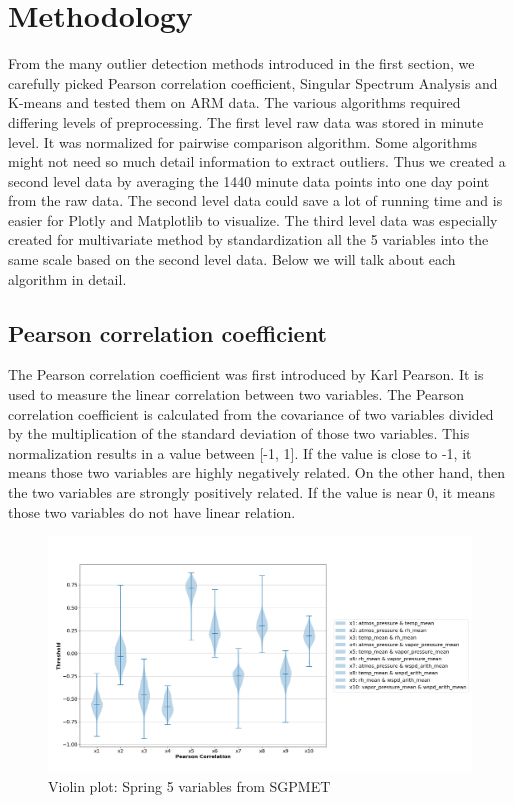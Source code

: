 \documentclass[letterpaper, 10 pt, conference]{ieeeconf}  %
\begin{document}
\section{Methodology}
From the many outlier detection methods introduced in the first section, we carefully picked Pearson correlation coefficient, Singular Spectrum Analysis and K-means and tested them on ARM data. The various algorithms required differing levels of preprocessing. The first level raw data was stored in minute level. It was normalized for pairwise comparison algorithm. Some algorithms might not need so much detail information to extract outliers. Thus we created a second level data by averaging the 1440 minute data points into one day point from the raw data. The second level data could save a lot of running time and is easier for Plotly \cite{plotly} and Matplotlib \cite{Hunter:2007} to visualize. The third level data was especially created for multivariate method by standardization all the 5 variables into the same scale based on the second level data. Below we will talk about each algorithm in detail. 

\subsection{Pearson correlation coefficient} 
The Pearson correlation coefficient was first introduced by Karl Pearson\cite{pearson1895note}. It is used to measure the linear correlation between two variables. The Pearson correlation coefficient is calculated from the covariance of two variables divided by the multiplication of the standard deviation of those two variables. This normalization results in a value between [-1, 1]. If the value is close to -1, it means those two variables are highly negatively related. On the other hand, then the two variables are strongly positively related. If the value is near 0, it means those two variables do not have linear relation. 

\begin{figure}[ht]
    \centering
    \includegraphics[width=\textwidth]{Spring.png}
    \caption{Violin plot: Spring 5 variables from SGPMET}
    \label{fig:pc}
\end{figure}
\end{document}
